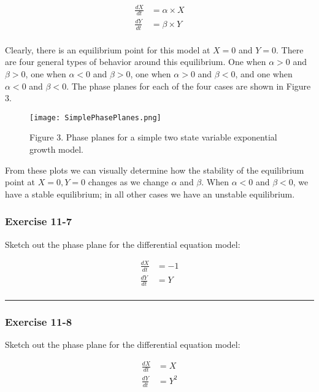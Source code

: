 \documentclass[]{memoir}
\makeatletter
\def\maxwidth{\ifdim\Gin@nat@width>\linewidth\linewidth
\else\Gin@nat@width\fi}
\let\Oldincludegraphics\includegraphics
\renewcommand{\includegraphics}[1]{\Oldincludegraphics[width=\maxwidth]{#1}}
\makeatother
\begin{document}
\[
\begin{aligned}
\frac{dX}{dt} &= \alpha \times X \\
\frac{dY}{dt} &= \beta \times Y \\
\end{aligned}
\]

Clearly, there is an equilibrium point for this model at $X=0$ and
$Y=0$. There are four general types of behavior around this equilibrium.
One when $\alpha>0$ and $\beta>0$, one when $\alpha<0$ and $\beta>0$,
one when $\alpha>0$ and $\beta<0$, and one when $\alpha<0$ and
$\beta<0$. The phase planes for each of the four cases are shown in
Figure 3.

\begin{figure}[htbp]
\centering
\texttt{[image: SimplePhasePlanes.png]}
\caption{Figure 3. Phase planes for a simple two state variable
exponential growth model.}
\end{figure}

From these plots we can visually determine how the stability of the
equilibrium point at $X=0, Y=0$ changes as we change $\alpha$ and
$\beta$. When $\alpha<0$ and $\beta<0$, we have a stable equilibrium; in
all other cases we have an unstable equilibrium.

\subsubsection{Exercise 11-7}

Sketch out the phase plane for the differential equation model:

\[
\begin{aligned}
\frac{dX}{dt} &=  -1 \\
\frac{dY}{dt} &= Y \\
\end{aligned}
\]

\begin{center}\rule{3in}{0.4pt}\end{center}

\subsubsection{Exercise 11-8}

Sketch out the phase plane for the differential equation model:

\[
\begin{aligned}
\frac{dX}{dt} &=  X \\
\frac{dY}{dt} &= Y^2 \\
\end{aligned}
\]
\end{document}
